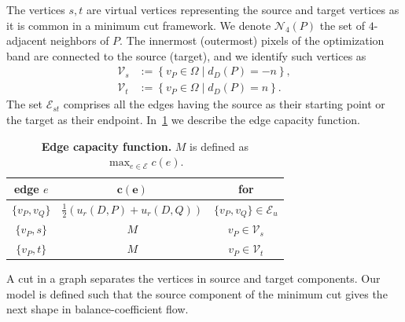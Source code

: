\documentclass[review]{siamart220329}
\newcommand{\digset}{D} %
\begin{document}
The vertices $s,t$ are virtual vertices representing the source and target
vertices as it is common in a minimum cut framework. We denote
$\mathcal{N}_4(P)$ the set of $4$-adjacent neighbors of $P$. The innermost
(outermost) pixels of the optimization band are connected to the source
(target), and we identify such vertices as
%
%
\begin{align*}
	\mathcal{V}_s &:=\left\{ v_P \in \Omega \; | \; d_{\digset}(P) = -n \right\}, \\
	\mathcal{V}_t &:=\left\{ v_P \in \Omega \; | \; d_{\digset}(P) = n \right\}.
\end{align*}
%
%
The set $\mathcal{E}_{st}$ comprises all the edges having the source as their
starting point or the target as their endpoint. In~\cref{tab:edge-capacity} we
describe the edge capacity function.
%
%
\begin{table}
\footnotesize
	\caption{\textbf{Edge capacity function.} $M$ is defined as $\max_{e \in \mathcal{E} }{ c(e) }$.}\label{tab:edge-capacity}
\begin{center}
\begin{tabular}{|c|c|c|}
\hline
\textbf{edge} $e$ & $\mathbf{c(e)}$ & \textbf{for}\\
\hline
$\{v_P, v_Q\}$ & $ \frac{1}{2}\left( u_r(\digset,P) + u_r(\digset,Q) \right) $ & $\{v_P,v_Q\} \in \mathcal{E}_{u}$\\
\hline
$\{v_P, s\}$ & $M$ & $v_P \in \mathcal{V}_{s}$ \\
\hline
$\{v_P, t\}$ & $M$ & $v_P \in \mathcal{V}_{t}$ \\
\hline
\end{tabular}
\end{center}
\end{table}
%
%

A cut in a graph separates the vertices in source and target components. Our
model is defined such that the source component of the minimum cut gives the
next shape in balance-coefficient flow. 

%
%
%
%
\end{document}
